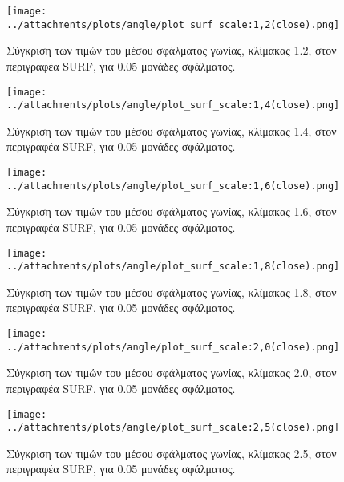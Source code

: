  \begin{figure}[ht!]
\begin{minipage}[b]{1.0\linewidth}
\centering
\texttt{[image: ../attachments/plots/angle/plot\_surf\_scale:1,2(close).png]}
\caption{Σύγκριση των τιμών του μέσου σφάλματος γωνίας, κλίμακας 1.2, στον περιγραφέα SURF, για 0.05 μονάδες σφάλματος.}
\label{figure:plot_scale_surf_low_1.2}
\end{minipage}
\end{figure} 
\begin{figure}[ht!]
\begin{minipage}[b]{1.0\linewidth}
\centering
\texttt{[image: ../attachments/plots/angle/plot\_surf\_scale:1,4(close).png]}
\caption{Σύγκριση των τιμών του μέσου σφάλματος γωνίας, κλίμακας 1.4, στον περιγραφέα SURF, για 0.05 μονάδες σφάλματος.}
\label{figure:plot_scale_surf_low_1.4}
\end{minipage}

 \end{figure} 
 
 \newpage
 
 \begin{figure}[ht!]
\begin{minipage}[b]{1.0\linewidth}
\centering
\texttt{[image: ../attachments/plots/angle/plot\_surf\_scale:1,6(close).png]}
\caption{Σύγκριση των τιμών του μέσου σφάλματος γωνίας, κλίμακας 1.6, στον περιγραφέα SURF, για 0.05 μονάδες σφάλματος.}
\label{figure:plot_scale_surf_low_1.6}
\end{minipage}
\end{figure} 
\begin{figure}[ht!]
\begin{minipage}[b]{1.0\linewidth}
\centering
\texttt{[image: ../attachments/plots/angle/plot\_surf\_scale:1,8(close).png]}
\caption{Σύγκριση των τιμών του μέσου σφάλματος γωνίας, κλίμακας 1.8, στον περιγραφέα SURF, για 0.05 μονάδες σφάλματος.}
\label{figure:plot_scale_surf_low_1.8}
\end{minipage}

 \end{figure} 
 
 \newpage
 
 \begin{figure}[ht!]
\begin{minipage}[b]{1.0\linewidth}
\centering
\texttt{[image: ../attachments/plots/angle/plot\_surf\_scale:2,0(close).png]}
\caption{Σύγκριση των τιμών του μέσου σφάλματος γωνίας, κλίμακας 2.0, στον περιγραφέα SURF, για 0.05 μονάδες σφάλματος.}
\label{figure:plot_scale_surf_low_2.0}
\end{minipage}
\end{figure} 
\begin{figure}[ht!]
\begin{minipage}[b]{1.0\linewidth}
\centering
\texttt{[image: ../attachments/plots/angle/plot\_surf\_scale:2,5(close).png]}
\caption{Σύγκριση των τιμών του μέσου σφάλματος γωνίας, κλίμακας 2.5, στον περιγραφέα SURF, για 0.05 μονάδες σφάλματος.}
\label{figure:plot_scale_surf_low_2.5}
\end{minipage}

 \end{figure} 
 
